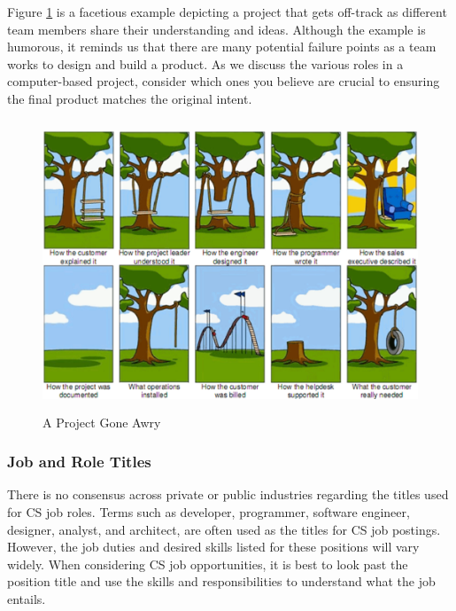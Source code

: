 Figure \ref{fig:figure1} is a facetious example depicting a project that gets off-track as different team members share their understanding and ideas. Although the example is humorous, it reminds us that there are many potential failure points as a team works to design and build a product. As we discuss the various roles in a computer-based project, consider which ones you believe are crucial to ensuring the final product matches the original intent.

\begin{figure}[H]
	\begin{center}
		\caption{A Project Gone Awry}
		\label{fig:figure1}
		\vskip 4pt
		\includegraphics[height=3.4in]{figs2/tree-swing-requirements-issue.png}
	\end{center}
\end{figure}

\vspace{10pt}

\subsubsection{Job and Role Titles}
There is no consensus across private or public industries regarding the titles used for CS job roles. Terms such as developer, programmer, software engineer, designer, analyst, and architect, are often used as the titles for CS job postings. However, the job duties and desired skills listed for these positions will vary widely. When considering CS job opportunities, it is best to look past the position title and use the skills and responsibilities to understand what the job entails.

